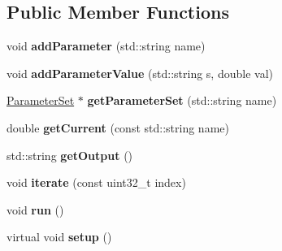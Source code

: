 \subsection*{Public Member Functions}
\begin{DoxyCompactItemize}
\item 
\hypertarget{classffactory_1_1_base_classifier_tester_af81d92ecb69257dd4353348d16955e26}{void {\bfseries add\-Parameter} (std\-::string name)}\label{classffactory_1_1_base_classifier_tester_af81d92ecb69257dd4353348d16955e26}

\item 
\hypertarget{classffactory_1_1_base_classifier_tester_ac4871c792a36124ead95c981985fb876}{void {\bfseries add\-Parameter\-Value} (std\-::string s, double val)}\label{classffactory_1_1_base_classifier_tester_ac4871c792a36124ead95c981985fb876}

\item 
\hypertarget{classffactory_1_1_base_classifier_tester_aa23052c083ad74bee350996fce2d972b}{\hyperlink{classffactory_1_1_parameter_set}{Parameter\-Set} $\ast$ {\bfseries get\-Parameter\-Set} (std\-::string name)}\label{classffactory_1_1_base_classifier_tester_aa23052c083ad74bee350996fce2d972b}

\item 
\hypertarget{classffactory_1_1_base_classifier_tester_a723c0872450cb17c51500522903ab22b}{double {\bfseries get\-Current} (const std\-::string name)}\label{classffactory_1_1_base_classifier_tester_a723c0872450cb17c51500522903ab22b}

\item 
\hypertarget{classffactory_1_1_base_classifier_tester_ab5c4b84416ecd74993c8a2511d8c1451}{std\-::string {\bfseries get\-Output} ()}\label{classffactory_1_1_base_classifier_tester_ab5c4b84416ecd74993c8a2511d8c1451}

\item 
\hypertarget{classffactory_1_1_base_classifier_tester_adc614e0d254d3a7ecc6fb6c7a3901f36}{void {\bfseries iterate} (const uint32\-\_\-t index)}\label{classffactory_1_1_base_classifier_tester_adc614e0d254d3a7ecc6fb6c7a3901f36}

\item 
\hypertarget{classffactory_1_1_base_classifier_tester_a4326b5a4aba9af63f3b59fdefe465522}{void {\bfseries run} ()}\label{classffactory_1_1_base_classifier_tester_a4326b5a4aba9af63f3b59fdefe465522}

\item 
\hypertarget{classffactory_1_1_base_classifier_tester_a10509e17be4fd4ad31adec31d80e5ac6}{virtual void {\bfseries setup} ()}\label{classffactory_1_1_base_classifier_tester_a10509e17be4fd4ad31adec31d80e5ac6}


\end{DoxyCompactItemize}
